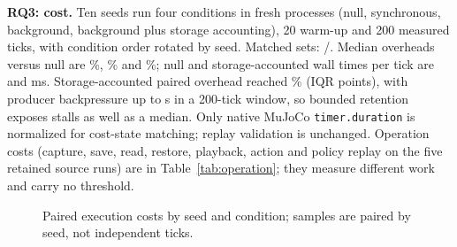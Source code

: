 \documentclass[letterpaper]{article}
\newcommand{\studyinput}[1]{}
\begin{document}
\begin{table}[t]
\centering\small
\caption{Continuation and replay under the frozen policy. Counts are pairs or trajectories, never ticks.}
\label{tab:replay}\resizebox{\columnwidth}{!}{\studyinput{replay-table}}
\end{table}

\begin{table}[t]
\centering\small
\caption{S1 first continuation action after the eight-tick prefix; absolute errors recomputed from retained arrays.}
\label{tab:snapshot-ablation}\resizebox{\columnwidth}{!}{\studyinput{snapshot-ablation}}
\end{table}

\textbf{RQ3: cost.} Ten seeds run four conditions in fresh processes (null, synchronous, background, background plus
storage accounting), 20 warm-up and 200 measured ticks, with condition order rotated by seed. Matched sets:
\OverheadMatchedSeeds{}/\OverheadDeclaredSeeds{}. Median overheads versus null are \SynchronousOverheadMedian{}\%,
\BackgroundOverheadMedian{}\% and \StorageOverheadMedian{}\%; null and storage-accounted wall times per tick are
\NullWallMedianMs{} and \StorageWallMedianMs{} ms. Storage-accounted paired overhead reached \StorageOverheadMaximum{}\%
(IQR \StorageOverheadIQR{} points), with producer backpressure up to \StorageBackpressureMaximumSeconds{} s in a
200-tick window, so bounded retention exposes stalls as well as a median. Only native MuJoCo \texttt{timer.duration} is
normalized for cost-state matching; replay validation is unchanged. Operation costs (capture, save, read, restore, playback, action and policy replay on the five retained source runs) are in Table~\ref{tab:operation}; they measure different work and carry no threshold.

\begin{table}[t]
\centering\small
\caption{Matched execution cost. All four conditions for a seed enter or leave the timing summary together; open and close costs are separate from tick time. IQR (pp) is the interquartile range in percentage points.}
\label{tab:overhead}\resizebox{\textwidth}{!}{\studyinput{overhead-table}}
\end{table}
\begin{figure}[t]
\centering\resizebox{\columnwidth}{!}{\studyinput{overhead-plot}}
\caption{Paired execution costs by seed and condition; samples are paired by seed, not independent ticks.}
\label{fig:overhead}
\end{figure}
\end{document}
